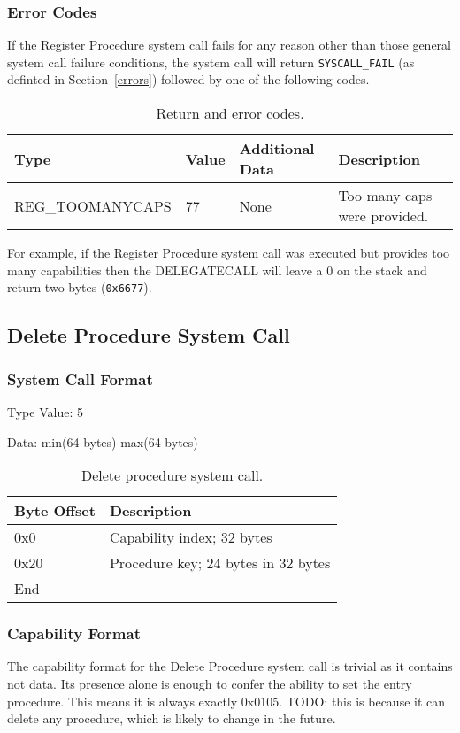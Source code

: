 \documentclass[english,a4paper]{article}
\let\oldparagraph\subsubsection
\renewcommand{\subsubsection}[1]{\oldparagraph{#1}\mbox{}}
\begin{document}
\subsubsection{Error Codes}
If the Register Procedure system call fails for any reason other than those
general system call failure conditions, the system call will return
\texttt{SYSCALL\_FAIL} (as definted in Section~\ref{errors}) followed by one of
the following codes.

\begin{table}[H]
  \caption{Return and error codes.}
  \centering{}%
  \begin{tabular}{l|l|p{}|p{}}
    \hline
    Type & Value & Additional Data & Description\tabularnewline
    \hline
    \hline
    REG\_TOOMANYCAPS  & 77 & None & Too many caps were provided. \tabularnewline
    \hline
  \end{tabular}
\end{table}

For example, if the Register
Procedure system call was executed but provides too many capabilities then the
DELEGATECALL will leave a 0 on the stack and return two bytes (\texttt{0x6677}).

\subsection{Delete Procedure System Call}

\subsubsection{System Call Format}
Type Value: 5

Data: min(64 bytes) max(64 bytes)

\begin{table}[H]
  \caption{Delete procedure system call.}
  \centering{}%
  \begin{tabular}{l|p{}}
    \hline
    Byte Offset & Description\tabularnewline
    \hline
    \hline
    0x0 & Capability index; 32 bytes \tabularnewline
    0x20 & Procedure key; 24 bytes in 32 bytes \tabularnewline
    \hline
    End &  \tabularnewline
    \hline
  \end{tabular}
\end{table}

\subsubsection{Capability Format}
The capability format for the Delete Procedure system call is trivial as it
contains not data. Its presence alone is enough to confer the ability to set the
entry procedure. This means it is always exactly 0x0105. TODO: this is because
it can delete any procedure, which is likely to change in the future.
\end{document}
